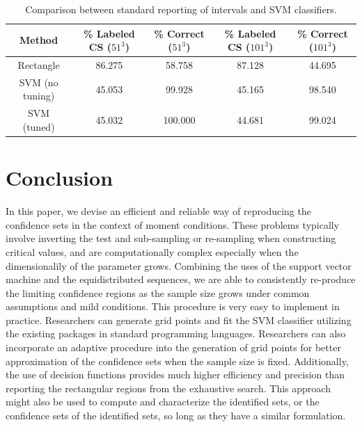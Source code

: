 \documentclass[12pt]{article}
\theoremstyle{definition}
\begin{document}
\begin{table}
    \centering
    \begin{tabular}{ccccc}
        \hline
        Method & \% Labeled CS ($51^3$) & \% Correct ($51^3$) & \% Labeled CS ($101^3$) & \% Correct ($101^3$) \\
        \hline
        \hline
        Rectangle & 86.275 & 58.758 & 87.128 & 44.695 \\
        SVM (no tuning) & 45.053 & 99.928 & 45.165 & 98.540 \\
        SVM (tuned) & 45.032 & 100.000 & 44.681 & 99.024 \\
        \hline
    \end{tabular}
    \caption{Comparison between standard reporting of intervals and SVM classifiers.}
    \label{table_cht}
\end{table}



\section{Conclusion}\label{conclusion}
In this paper, we devise an efficient and reliable way of reproducing the confidence sets in the context of moment conditions. These problems typically involve inverting the test and sub-sampling or re-sampling when constructing critical values, and are computationally complex especially when the dimensionalily of the parameter grows. Combining the uses of the support vector machine and the equidistributed sequences, we are able to consistently re-produce the limiting confidence regions as the sample size grows under common assumptions and mild conditions. This procedure is very easy to implement in practice. Researchers can generate grid points and fit the SVM classifier utilizing the existing packages in standard programming languages. Researchers can also incorporate an adaptive procedure into the generation of grid points for better approximation of the confidence sets when the sample size is fixed. Additionally, the use of decision functions provides much higher efficiency and precision than reporting the rectangular regions from the exhaustive search. This approach might also be used to compute and characterize the identified sets, or the confidence sets of the identified sets, so long as they have a similar formulation. 
\end{document}
